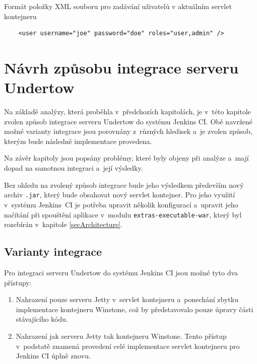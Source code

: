 \begin{priklad} \label{prUsers}
    Formát položky XML souboru pro zadávání uživatelů v aktuálním servlet kontejneru
\begin{verbatim}
    <user username="joe" password="doe" roles="user,admin" />
\end{verbatim}
\end{priklad}



    \section{Návrh způsobu integrace serveru Undertow} \label{secNavrh}
        Na základě analýzy, která proběhla v~předchozích kapitolách,
        je v~této kapitole zvolen způsob
        integrace serveru Undertow do systému Jenkins CI. 
        Obě navržené možné varianty integrace jsou porovnány z~různých
        hledisek a~je zvolen způsob, kterým bude následně implementace provedena.

        Na závěr kapitoly jsou popsány problémy, které byly objeny při analýze
        a~mají dopad na samotnou integraci a~její výsledky.


        \medskip
        Bez ohledu na zvolený způsob integrace bude jeho výsledkem především nový archiv \texttt{.jar},
        který bude obsahovat nový servlet kontejner. Pro jeho využití v~systému Jenkins~CI je potřeba
        upravit několik konfigurací a~upravit jeho načítání při spouštění aplikace v~modulu
        \texttt{extras-executable-war}, který byl rozebírán v~kapitole \ref{secArchitecture}.

                
        \subsection{Varianty integrace}
            Pro integraci serveru Undertow do systému Jenkins CI jsou možné tyto dva přístupy:

            \begin{enumerate}
                \item{Nahrazení pouze serveru Jetty v~servlet kontejneru a~ponechání
                    zbytku implementace kontejneru Winstone, což by představovalo
                    pouze úpravy části stávajícího kódu. }

                \item{Nahrazení jak serveru Jetty tak kontejneru Winstone. 
                    Tento přístup v~podstatě znamená provedení celé implementace
                    servlet kontejneru pro Jenkins CI úplně znovu.}
            \end{enumerate}

